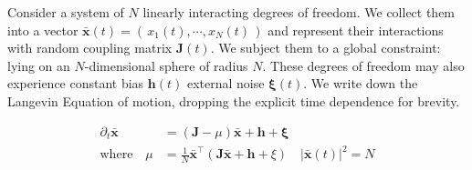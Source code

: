 Consider a system of $N$ linearly interacting degrees of freedom. We collect them into a vector $\mathbf{\bar x}(t) = \left(\,x_1(t),\cdots, x_N(t)\,\right)$ and represent their interactions with random coupling matrix $\mathbf{J}(t)$. We subject them to a global constraint: lying on an $N$-dimensional sphere of radius $N$. These degrees of freedom may also experience constant bias $\mathbf{h}(t)$ external noise $\boldsymbol\xi(t)$. We write down the Langevin Equation of motion, dropping the explicit time dependence for brevity.

\begin{align}
\partial_t\mathbf{\bar x} &= (\mathbf{J}-\mu)\mathbf{\bar x}+\mathbf{h}+\boldsymbol\xi \\
\mathrm{where}\quad\mu &= \frac{1}{N}\mathbf{\bar x}^{\top}\left(\mathbf{J}\mathbf{\bar x}+\mathbf{h}+\xi\right)\quad\mathrm|\mathbf{\bar x}(t)|^2=N
\end{align}
